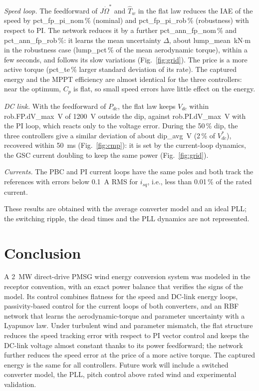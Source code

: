 \documentclass[conference]{IEEEtran}
\begin{document}
\emph{Speed loop.} The feedforward of $J\dot\Omega^*$ and $\hat T_w$ in the flat law reduces the IAE of
the speed by {{pct_fp_pi_nom}}\,\% (nominal) and {{pct_fp_pi_rob}}\,\% (robustness) with respect to PI.
The network reduces it by a further {{pct_ann_fp_nom}}\,\% and {{pct_ann_fp_rob}}\,\%: it learns the mean
uncertainty $\Delta$, about {{lump_mean}}~kN$\cdot$m in the robustness case ({{lump_pct}}\,\% of the
mean aerodynamic torque), within a few seconds, and follows its slow variations (Fig.~\ref{fig:grid}).
The price is a more active torque ({{pct_te}}\,\% larger standard deviation of its rate). The captured
energy and the MPPT efficiency are almost identical for the three controllers: near the optimum, $C_p$ is
flat, so small speed errors have little effect on the energy.

\emph{DC link.} With the feedforward of $P_{dc}$, the flat law keeps $V_{dc}$ within
{{rob.FP.dV_max}}~V of 1200~V outside the dip, against {{rob.PI.dV_max}}~V with the PI loop, which reacts
only to the voltage error. During the 50\,\% dip, the three controllers give a similar deviation of
about {{dip_avg}}~V (2\,\% of $V_{dc}^*$), recovered within 50~ms (Fig.~\ref{fig:cmp}): it is set by the
current-loop dynamics, the GSC current doubling to keep the same power (Fig.~\ref{fig:grid}).

\emph{Currents.} The PBC and PI current loops have the same poles and both track the references with
errors below 0.1~A RMS for $i_{sq}$, i.e., less than 0.01\,\% of the rated current.

These results are obtained with the average converter model and an ideal PLL; the switching ripple,
the dead times and the PLL dynamics are not represented.

\section{Conclusion}
A 2~MW direct-drive PMSG wind energy conversion system was modeled in the receptor convention, with an
exact power balance that verifies the signs of the model. Its control combines flatness for the speed
and DC-link energy loops, passivity-based control for the current loops of both converters, and an RBF
network that learns the aerodynamic-torque and parameter uncertainty with a Lyapunov law. Under
turbulent wind and parameter mismatch, the flat structure reduces the speed tracking error with respect
to PI vector control and keeps the DC-link voltage almost constant thanks to its power feedforward; the
network further reduces the speed error at the price of a more active torque. The captured energy is
the same for all controllers. Future work will include a switched converter model, the PLL, pitch
control above rated wind and experimental validation.
\end{document}

